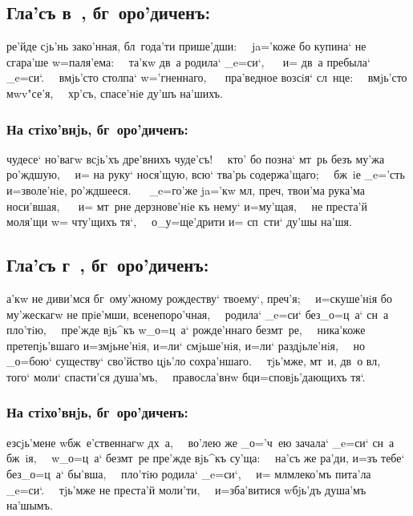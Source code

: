 \documentclass[14pt,twoside]{extreport}
\renewcommand{\*}{~~\raise3pt\hbox{\footnotesize*}}
\begin{document}
\delimpict

\subsection[Гла'съ в~]{Гла'съ в~, бг~оро'диченъ:}

ре'йде сjь'нь зако'нная, бл~года'ти прише'дши:\* ja='коже
бо купина` не сгара'ше w=паля'ема:\* та'кw дв~а родила` _e=си`,
\* и= дв~а пребыла` _e=си`.\* вмjь'сто столпа` w='гненнаго,
\* пра'ведное возсiя` сл~нце:\* вмjь'сто мwv"се'я,\*
хр'съ, спасе'нiе ду'шъ на'шихъ.

\subsubsection{На стiхо'внjь, бг~оро'диченъ:}

 чудесе` но'вагw всjь'хъ дре'внихъ чуде'съ!\* кто' бо
позна` мт~рь безъ му'жа ро'ждшую,\* и= на руку` нося'щую, всю`
тва'рь содержа'щаго;\* бж~iе _e='сть и=зволе'нiе, ро'ждшееся.
\* _e=го'же ja='кw мл, преч, твои'ма рука'ма носи'вшая,
\* и= мт~рне дерзнове'нiе къ нему` и=му'щая,\* не преста'й
моля'щи w= чту'щихъ тя`,\* о_у=ще'дрити и= сп~сти` ду'шы на'шя.

\delimpict

\subsection[Гла'съ г~]{Гла'съ г~, бг~оро'диченъ:}

а'кw не диви'мся бг~ому'жному рождеству` твоему`, преч'я;\*
и=скуше'нiя бо му'жескагw не прiе'мши, всенепоро'чная,\* родила`
_e=си` без\ъ _о=ц~а` сн~а пло'тiю,\* пре'жде вjь^къ w\т _о=ц~а`
рожде'ннаго без\ъ мт~ре,\* ника'коже претепjь'вшаго и=змjьне'нiя,
и=ли` смjьше'нiя, и=ли` раздjьле'нiя,\* но _о=бою` существу` сво'йство
цjь'ло сохра'ншаго.\* тjь'мже, мт~и, дв~о вл,\* того` моли`
спасти'ся душа'мъ,\* правосла'внw бц и=сповjь'дающихъ тя`.

\subsubsection{На стiхо'внjь, бг~оро'диченъ:}

ез\ъ сjь'мене w\т бж~е'ственнагw дх~а,\* во'лею же _о='ч~ею зачала`
_e=си` сн~а бж~iя,\* w\т _о=ц~а` без\ъ мт~ре пре'жде вjь^къ су'ща:\*
на'съ же ра'ди, и=зъ тебе` без\ъ _о=ц~а` бы'вша,\* пло'тiю родила`
_e=си`,\* и= мл млеко'мъ пита'ла _e=си`.\* тjь'мже не преста'й
моли'ти,\* и=зба'витися w\т бjь'дъ душа'мъ на'шымъ.
\end{document}
